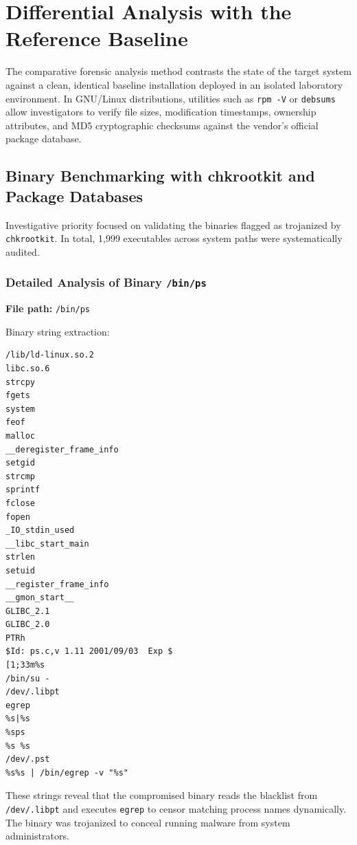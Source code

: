 \chapter{Differential Analysis with the Reference Baseline}

The comparative forensic analysis method contrasts the state of the target system against a clean, identical baseline installation deployed in an isolated laboratory environment. In GNU/Linux distributions, utilities such as \texttt{rpm -V} or \texttt{debsums} allow investigators to verify file sizes, modification timestamps, ownership attributes, and MD5 cryptographic checksums against the vendor's official package database.

\section{Binary Benchmarking with chkrootkit and Package Databases}

Investigative priority focused on validating the binaries flagged as trojanized by \texttt{chkrootkit}. In total, 1,999 executables across system paths were systematically audited.

\subsection{Detailed Analysis of Binary \texttt{/bin/ps}}

\noindent\textbf{File path:} \texttt{/bin/ps}

Binary string extraction:

\vspace{1em}

\begin{lstlisting}[style=terminal]
/lib/ld-linux.so.2
libc.so.6
strcpy
fgets
system
feof
malloc
__deregister_frame_info
setgid
strcmp
sprintf
fclose
fopen
_IO_stdin_used
__libc_start_main
strlen
setuid
__register_frame_info
__gmon_start__
GLIBC_2.1
GLIBC_2.0
PTRh
$Id: ps.c,v 1.11 2001/09/03  Exp $
[1;33m%s
/bin/su -
/dev/.libpt
egrep
%s|%s
%sps
%s %s
/dev/.pst
%s%s | /bin/egrep -v "%s"
\end{lstlisting}

\vspace{1em}

These strings reveal that the compromised binary reads the blacklist from \texttt{/dev/.libpt} and executes \texttt{egrep} to censor matching process names dynamically. The binary was trojanized to conceal running malware from system administrators.

